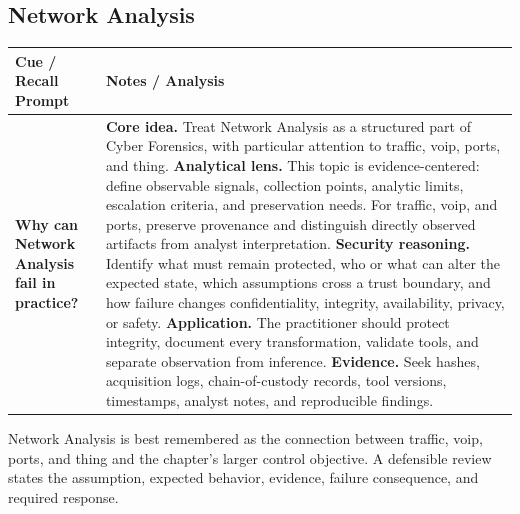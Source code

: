 \documentclass[11pt]{article}
\newcommand{\CornellHeader}{%
\rowcolor{Navy}\color{white}\bfseries Cue / Recall Prompt & \color{white}\bfseries Notes / Analysis\\\hline}
\newcommand{\CornellRow}[2]{%
\cellcolor{CueGray}\RaggedRight\textbf{#1} & \RaggedRight #2\\\hline}
\begin{document}
\subsection*{Network Analysis}
\begin{longtable}{>{\RaggedRight\arraybackslash}p{}|>{\RaggedRight\arraybackslash}p{}}
\CornellHeader
\CornellRow{Why can Network Analysis fail in practice?}{\textbf{Core idea.} Treat Network Analysis as a structured part of Cyber Forensics, with particular attention to traffic, voip, ports, and thing. \textbf{Analytical lens.} This topic is evidence-centered: define observable signals, collection points, analytic limits, escalation criteria, and preservation needs. For traffic, voip, and ports, preserve provenance and distinguish directly observed artifacts from analyst interpretation. \textbf{Security reasoning.} Identify what must remain protected, who or what can alter the expected state, which assumptions cross a trust boundary, and how failure changes confidentiality, integrity, availability, privacy, or safety. \textbf{Application.} The practitioner should protect integrity, document every transformation, validate tools, and separate observation from inference. \textbf{Evidence.} Seek hashes, acquisition logs, chain-of-custody records, tool versions, timestamps, analyst notes, and reproducible findings.}
\end{longtable}
\begin{topicsummary}
Network Analysis is best remembered as the connection between traffic, voip, ports, and thing and the chapter's larger control objective. A defensible review states the assumption, expected behavior, evidence, failure consequence, and required response.
\end{topicsummary}
\end{document}
